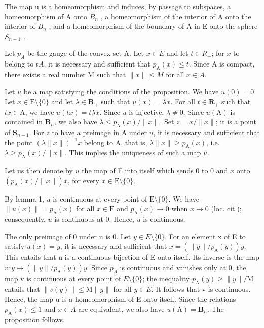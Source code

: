 The map u is a homeomorphism and induces, by passage to subspaces, a homeomorphism of A onto \(B_{n}\) , a homeomorphism of the interior of A onto the interior of \(B_{n}\) , and a homeomorphism of the boundary of A in E onto the sphere \(S_{n-1}\) .

Let \(p_{A}\) be the gauge of the convex set A. Let \(x \in E\) and let \(t \in R_{+}\); for \(x\) to belong to \(tA\), it is necessary and sufficient that \(p_{\mathrm{A}}(x) \leqslant t\). Since A is compact, there exists a real number M such that \(\|x\| \leqslant M\) for all \(x \in A\).

Let \(u\) be a map satisfying the conditions of the proposition. We have \(u(0) = 0\). Let \(x \in \mathrm{E}\setminus\{0\}\) and let \(\lambda \in \mathbf{R}_+\) such that \(u(x) = \lambda x\). For all \(t \in \mathbf{R}_+\) such that \(tx \in \mathrm{A}\), we have \(u(tx) = t\lambda x\). Since \(u\) is injective, \(\lambda \neq 0\). Since \(u(\mathrm{A})\) is contained in \(\mathbf{B}_n\), we also have \(\lambda \leqslant p_{\mathrm{A}}(x)/\|x\|\). Set \(z = x/\|x\|\); it is a point of \(\mathbf{S}_{n-1}\). For \(z\) to have a preimage in A under \(u\), it is necessary and sufficient that the point \((\lambda \|x\|)^{-1}x\) belong to A, that is, \(\lambda \|x\| \geqslant p_{\mathrm{A}}(x)\), i.e. \(\lambda \geqslant p_{\mathrm{A}}(x)/\|x\|\). This implies the uniqueness of such a map \(u\).

Let us then denote by \(u\) the map of E into itself which sends 0 to 0 and \(x\) onto \((p_{\mathrm{A}}(x) / \| x\|)x\), for every \(x \in \mathrm{E}\setminus\{0\}\).

By lemma 1, \(u\) is continuous at every point of \(\mathrm{E}\setminus\{0\}\). We have \(\| u(x)\| = p_{\mathrm{A}}(x)\) for all \(x\in \mathrm{E}\) and \(p_{\mathrm{A}}(x)\to 0\) when \(x\to 0\) (loc. cit.); consequently, \(u\) is continuous at 0. Hence, \(u\) is continuous.

The only preimage of 0 under u is 0. Let \(y \in E\setminus\{0\}\). For an element x of E to satisfy \(u(x) = y\), it is necessary and sufficient that \(x = (\|y\| / p_{\mathrm{A}}(y))y\). This entails that u is a continuous bijection of E onto itself. Its inverse is the map \(v: y \mapsto (\|y\| / p_{\mathrm{A}}(y))y\). Since \(p_{A}\) is continuous and vanishes only at 0, the map v is continuous at every point of \(E\setminus\{0\}\); the inequality \(p_{\mathrm{A}}(y) \geqslant \|y\| / \mathrm{M}\) entails that \(\|v(y)\| \leqslant \mathrm{M}\|y\|\) for all \(y \in E\). It follows that v is continuous. Hence, the map u is a homeomorphism of E onto itself. Since the relations \(p_{\mathrm{A}}(x) \leqslant 1\) and \(x \in A\) are equivalent, we also have \(u(\mathrm{A}) = \mathbf{B}_{n}\). The proposition follows.

